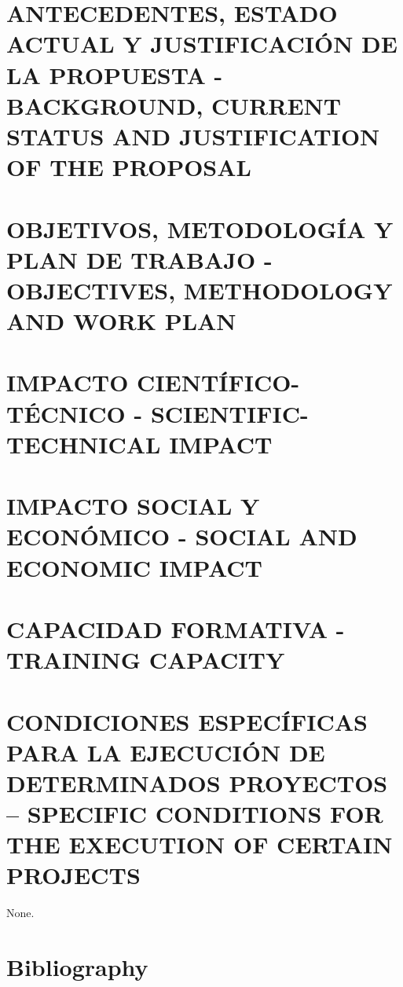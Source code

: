 \documentclass[a4paper,11pt,oneside, english]{article}
\begin{document}
\section{\small ANTECEDENTES, ESTADO ACTUAL Y JUSTIFICACIÓN DE LA PROPUESTA - BACKGROUND, CURRENT STATUS AND JUSTIFICATION OF THE PROPOSAL}
\label{sec.just}

\label{sec.proposal}







\section{\small  OBJETIVOS, METODOLOGÍA Y PLAN DE TRABAJO - OBJECTIVES, METHODOLOGY AND WORK PLAN}











\section{\small  IMPACTO CIENTÍFICO-TÉCNICO - SCIENTIFIC-TECHNICAL IMPACT}
\label{sec.impact}

\section{\small  IMPACTO SOCIAL Y ECONÓMICO - SOCIAL AND ECONOMIC IMPACT}
\label{sec.social}


\section{\small CAPACIDAD FORMATIVA - TRAINING CAPACITY}
\label{sec.training}

\section{\small  CONDICIONES ESPECÍFICAS PARA LA EJECUCIÓN DE DETERMINADOS PROYECTOS – SPECIFIC CONDITIONS FOR THE EXECUTION OF CERTAIN PROJECTS}
\label{sec.specs}
None.

\section{Bibliography}

%

\end{document}

